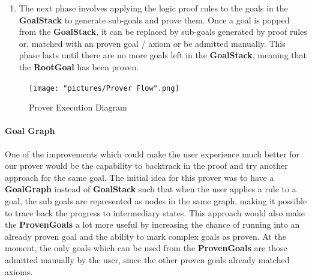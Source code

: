 \documentclass[12pt,a4paper]{article}
\begin{document}
{\begin{enumerate}
	This command will also populate the \textbf{ProvenGoals} list with axioms.
	\\
	
	Please note that the command is enclosed within parentheses, this being a requirement of Maude LOOP-MODE \cite{manual}. All the prover specific commands need to be enclosed in parenthesis. The previous command, \texttt{loop init .} was not enclosed because it is a Maude specific command, not something we want to pass as input to our prover.
	\item The next phase involves applying the logic proof rules to the goals in the \textbf{GoalStack} to generate sub-goals and prove them. Once a goal is popped from the \textbf{GoalStack}, it can be replaced by sub-goals generated by proof rules or, matched with an proven goal / axiom or be admitted manually. This phase lasts until there are no more goals left in the \textbf{GoalStack}, meaning that the \textbf{RootGoal} has been proven.
\end{enumerate}
\begin{figure}[h]
	\texttt{[image: "pictures/Prover Flow".png]}
	\caption{Prover Execution Diagram}
	\label{fig:ProverDiagram}
\end{figure} 
\paragraph{Goal Graph} One of the improvements which could make the user experience much better for our prover would be the capability to backtrack in the proof and try another approach for the same goal. The initial idea for this prover was to have a \textbf{GoalGraph} instead of \textbf{GoalStack} such that when the user applies a rule to a goal, the sub goals are represented as nodes in the same graph, making it possible to trace back the progress to intermediary states. This approach would also make the \textbf{ProvenGoals} a lot more useful by increasing the chance of running into an already proven goal and the ability to mark complex goals as proven. At the moment, the only goals which can be used from the \textbf{ProvenGoals} are those admitted manually by the user, since the other proven goals already matched axioms.
\clearpage
}
\end{document}
